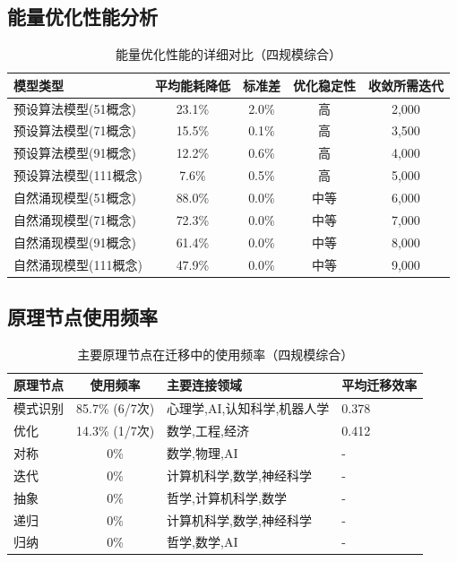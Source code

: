 \documentclass[12pt,a4paper]{article}
\begin{document}
\subsection{能量优化性能分析}

\begin{table}[H]
\centering
\caption{能量优化性能的详细对比（四规模综合）}
\label{tab:energy_optimization_detailed}
\begin{tabular}{p{3cm}cccc}
\toprule
\textbf{模型类型} & \textbf{平均能耗降低} & \textbf{标准差} & \textbf{优化稳定性} & \textbf{收敛所需迭代} \\
\midrule
预设算法模型(51概念) & 23.1\% & 2.0\% & 高 & 2,000 \\
预设算法模型(71概念) & 15.5\% & 0.1\% & 高 & 3,500 \\
预设算法模型(91概念) & 12.2\% & 0.6\% & 高 & 4,000 \\
预设算法模型(111概念) & 7.6\% & 0.5\% & 高 & 5,000 \\
自然涌现模型(51概念) & 88.0\% & 0.0\% & 中等 & 6,000 \\
自然涌现模型(71概念) & 72.3\% & 0.0\% & 中等 & 7,000 \\
自然涌现模型(91概念) & 61.4\% & 0.0\% & 中等 & 8,000 \\
自然涌现模型(111概念) & 47.9\% & 0.0\% & 中等 & 9,000 \\
\bottomrule
\end{tabular}
\end{table}

\subsection{原理节点使用频率}

\begin{table}[H]
\centering
\caption{主要原理节点在迁移中的使用频率（四规模综合）}
\label{tab:principle_nodes_frequency}
\begin{tabular}{p{2.5cm}cp{3cm}p{2cm}}
\toprule
\textbf{原理节点} & \textbf{使用频率} & \textbf{主要连接领域} & \textbf{平均迁移效率} \\
\midrule
模式识别 & 85.7\% (6/7次) & 心理学,AI,认知科学,机器人学 & 0.378 \\
优化 & 14.3\% (1/7次) & 数学,工程,经济 & 0.412 \\
对称 & 0\% & 数学,物理,AI & - \\
迭代 & 0\% & 计算机科学,数学,神经科学 & - \\
抽象 & 0\% & 哲学,计算机科学,数学 & - \\
递归 & 0\% & 计算机科学,数学,神经科学 & - \\
归纳 & 0\% & 哲学,数学,AI & - \\
\bottomrule
\end{tabular}
\end{table}
\end{document}
